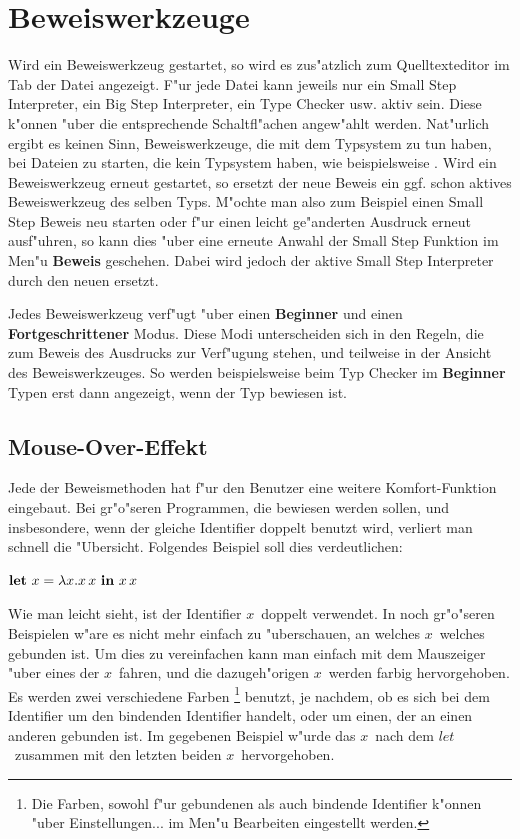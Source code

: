 \section {Beweiswerkzeuge}
\label{Beweiswerkzeuge} Wird ein Beweiswerkzeug gestartet, so wird
es zus"atzlich zum Quelltexteditor im Tab der Datei angezeigt. F"ur
jede Datei kann jeweils nur ein Small Step Interpreter, ein Big Step
Interpreter, ein Type Checker usw. aktiv sein. Diese k"onnen "uber die
entsprechende Schaltfl"achen angew"ahlt werden. Nat"urlich ergibt es keinen Sinn, Beweiswerkzeuge, die mit dem Typsystem zu tun haben, bei Dateien zu starten, die kein Typsystem haben, wie beispielsweise \LZERO. Wird ein
Beweiswerkzeug erneut gestartet, so ersetzt der neue Beweis ein ggf.
schon aktives Beweiswerkzeug des selben Typs. M"ochte man also zum
Beispiel einen Small Step Beweis neu starten oder f"ur einen leicht
ge"anderten Ausdruck erneut ausf"uhren, so kann dies "uber eine
erneute Anwahl der Small Step Funktion im Men"u {\bf Beweis}
geschehen. Dabei wird jedoch der aktive Small Step Interpreter durch
den neuen ersetzt.

Jedes Beweiswerkzeug verf"ugt "uber einen {\bf Beginner} und einen
{\bf Fortgeschrittener} Modus. Diese Modi unterscheiden sich in den
Regeln, die zum Beweis des Ausdrucks zur Verf"ugung stehen, und teilweise in der Ansicht des Beweiswerkzeuges. So werden beispielsweise beim Typ Checker im {\bf Beginner} Typen erst dann angezeigt, wenn der Typ bewiesen ist.

\subsection {Mouse-Over-Effekt}
Jede der Beweismethoden hat f"ur den Benutzer eine weitere Komfort-Funktion eingebaut. Bei gr"o"seren Programmen, 
die bewiesen werden sollen, und insbesondere, wenn der gleiche Identifier doppelt benutzt wird, verliert man schnell 
die "Ubersicht. Folgendes Beispiel soll dies verdeutlichen:

{\bf $\textbf{let}\ x = \lambda x.x\,x\ \textbf{in}\ x\,x$}

Wie man leicht sieht, ist der Identifier \glqq$x$\grqq\ doppelt verwendet. 
In noch gr"o"seren Beispielen w"are es nicht mehr einfach zu "uberschauen, an welches \glqq$x$\grqq\ welches gebunden ist. 
Um dies zu vereinfachen kann man einfach mit dem Mauszeiger "uber eines der \glqq$x$\grqq\ fahren, 
und die dazugeh"origen \glqq$x$\grqq\ werden farbig hervorgehoben. Es werden zwei verschiedene Farben
\footnote{Die Farben, sowohl f"ur gebundenen als auch bindende Identifier k"onnen "uber Einstellungen... im Men"u Bearbeiten eingestellt werden.} benutzt, je nachdem, ob es sich bei dem Identifier um den bindenden Identifier handelt, oder um einen, der an einen anderen gebunden ist. Im gegebenen Beispiel w"urde das \glqq$x$\grqq\ nach dem \glqq$let$\grqq\ zusammen mit den letzten beiden \glqq$x$\grqq\ hervorgehoben.

